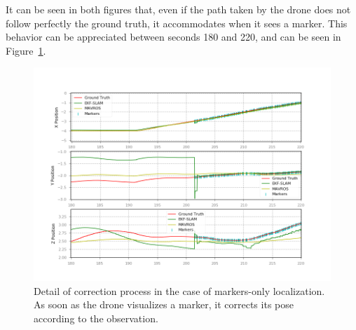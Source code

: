 It can be seen in both figures that, even if the path taken by the drone does not follow perfectly the ground truth, it accommodates when it sees a marker. This behavior can be appreciated between seconds 180 and 220, and can be seen in Figure~\ref{fig:chapter3:simulation:b:real-markers-correction-detail}.\\
\begin{figure}
    \centering
    \includegraphics[width=\textwidth]{Images/fig21-real-marker-wmap-correction-detail.png}
    \caption[Detail of correction process with markers.]{Detail of correction process in the case of markers-only localization. As soon as the drone visualizes a marker, it corrects its pose according to the observation.}
    \label{fig:chapter3:simulation:b:real-markers-correction-detail}
\end{figure}

